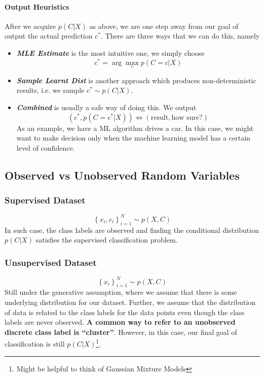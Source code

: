 \documentclass[11pt]{article}
\newcommand{\argmax}{\arg\max}
\begin{document}
\paragraph{Output Heuristics} After we acquire $p(C|X)$ as above, we are one step away from our goal of output the actual prediction $c^*$. There are three ways that we can do this, namely
\begin{itemize}
    \item \textit{\textbf{MLE Estimate}} is the most intuitive one, we simply choose
        \begin{equation*}
            c^* = \argmax_c p(C = c|X)
        \end{equation*}
    \item \textit{\textbf{Sample Learnt Dist}} is another approach which produces non-deterministic results, i.e. we sample $c^* \sim p(C|X)$.
    \item \textit{\textbf{Combined}} is usually a safe way of doing this. We output
        \begin{equation*}
            (c^*, p(C=c^*|X)) \iff (\text{result}, \text{how sure?})
        \end{equation*}
    As an example, we have a ML algorithm drives a car. In this case, we might want to make decision only when the machine learning model has a certain level of confidence. 
\end{itemize}

\subsection{Observed vs Unobserved Random Variables}
\subsubsection{Supervised Dataset}
\begin{equation*}
    \left\{x_{i}, c_{i}\right\}_{i=1}^{N} \sim p(X, C)
\end{equation*}
In such case, the class labels are observed and finding the conditional distribution $p(C|X)$ satisfies the supervised classification problem. 

\subsubsection{Unsupervised Dataset}
\begin{equation*}
    \left\{x_{i}\right\}_{i=1}^{N} \sim p(X, C)
\end{equation*}
Still under the generative assumption, where we assume that there is some underlying distribution for our dataset. Further, we assume that the distribution of data is related to the class labels for the data points even though the class labels are never observed. \textbf{A common way to refer to an unobserved discrete class label is ``cluster''}. However, in this case, our final goal of classification is still $p(C|X)$\footnote{Might be helpful to think of Gaussian Mixture Models}. 
\end{document}
